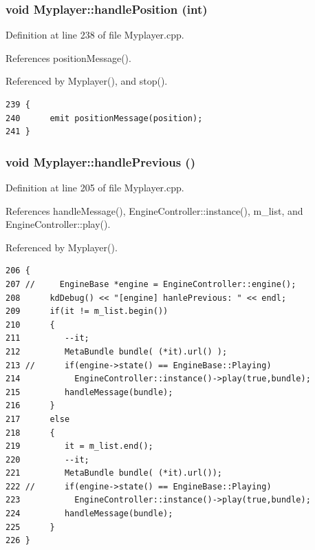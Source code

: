 \subsubsection{\setlength{\rightskip}{0pt plus 5cm}void Myplayer::handle\-Position (int)\hspace{0.3cm}{\tt  [slot]}}\label{classMyplayer_Myplayeri11}




Definition at line 238 of file Myplayer.cpp.

References position\-Message().

Referenced by Myplayer(), and stop().



\footnotesize\begin{verbatim}239 {    
240      emit positionMessage(position);     
241 }
\end{verbatim}\normalsize 
{}
\subsubsection{\setlength{\rightskip}{0pt plus 5cm}void Myplayer::handle\-Previous ()\hspace{0.3cm}{\tt  [slot]}}\label{classMyplayer_Myplayeri10}




Definition at line 205 of file Myplayer.cpp.

References handle\-Message(), Engine\-Controller::instance(), m\_\-list, and Engine\-Controller::play().

Referenced by Myplayer().



\footnotesize\begin{verbatim}206 {
207 //     EngineBase *engine = EngineController::engine();
208      kdDebug() << "[engine] hanlePrevious: " << endl;
209      if(it != m_list.begin())
210      {
211         --it;
212         MetaBundle bundle( (*it).url() );  
213 //      if(engine->state() == EngineBase::Playing)
214           EngineController::instance()->play(true,bundle); 
215         handleMessage(bundle);    
216      }
217      else
218      {
219         it = m_list.end();
220         --it;
221         MetaBundle bundle( (*it).url());
222 //      if(engine->state() == EngineBase::Playing)
223           EngineController::instance()->play(true,bundle);
224         handleMessage(bundle);
225      }
226 }
\end{verbatim}\normalsize 
{}
